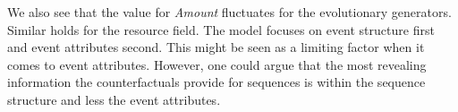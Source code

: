 \documentclass[./../../paper.tex]{subfiles}
\begin{document}




%     
    
%     
    

We also see that the value for \emph{Amount} fluctuates for the evolutionary generators. Similar holds for the resource field. The model focuses on event structure first and event attributes second. This might be seen as a limiting factor when it comes to event attributes. However, one could argue that the most revealing information the counterfactuals provide for sequences is within the sequence structure and less the event attributes. 





\end{document}
